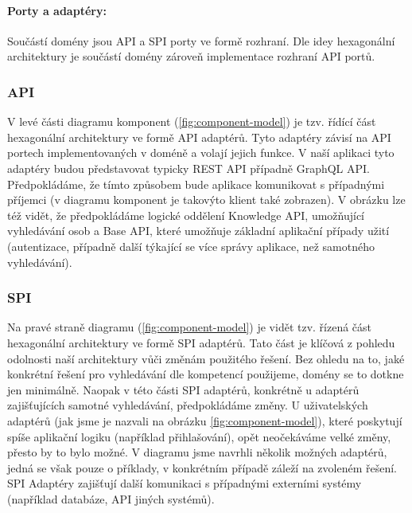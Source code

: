 \paragraph{Porty a adaptéry:}
Součástí domény jsou API a SPI porty ve formě rozhraní. Dle idey hexagonální architektury je součástí domény zároveň implementace rozhraní API portů.
\subsubsection{API}
V levé části diagramu komponent (\ref{fig:component-model}) je tzv. řídící část hexagonální architektury ve formě API adaptérů. Tyto adaptéry závisí na API portech implementovaných v doméně a volají jejich funkce. V naší aplikaci tyto adaptéry budou představovat typicky REST API případně GraphQL API. Předpokládáme, že tímto způsobem bude aplikace komunikovat s případnými příjemci (v diagramu komponent je takovýto klient také zobrazen). V obrázku lze též vidět, že předpokládáme logické oddělení Knowledge API, umožňující vyhledávání osob a Base API, které umožňuje základní aplikační případy užití (autentizace, případně další týkající se více správy aplikace, než samotného vyhledávání).

\subsubsection{SPI}
Na pravé straně diagramu (\ref{fig:component-model}) je vidět tzv. řízená část hexagonální architektury ve formě SPI adaptérů. Tato část je klíčová z pohledu odolnosti naší architektury vůči změnám použitého řešení. Bez ohledu na to, jaké konkrétní řešení pro vyhledávání dle kompetencí použijeme, domény se to dotkne jen minimálně. Naopak v této části SPI adaptérů, konkrétně u adaptérů zajišťujících samotné vyhledávání, předpokládáme změny. U uživatelských adaptérů (jak jsme je nazvali na obrázku \ref{fig:component-model}), které poskytují spíše aplikační logiku (například přihlašování), opět neočekáváme velké změny, přesto by to bylo možné. V diagramu jsme navrhli několik možných adaptérů, jedná se však pouze o příklady, v konkrétním případě záleží na zvoleném řešení. SPI Adaptéry zajišťují další komunikaci s případnými externími systémy (například databáze, API jiných systémů).\par
